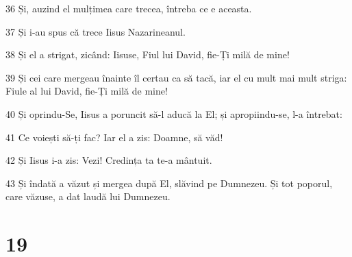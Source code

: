 \par 36 Și, auzind el mulțimea care trecea, întreba ce e aceasta.
\par 37 Și i-au spus că trece Iisus Nazarineanul.
\par 38 Și el a strigat, zicând: Iisuse, Fiul lui David, fie-Ți milă de mine!
\par 39 Și cei care mergeau înainte îl certau ca să tacă, iar el cu mult mai mult striga: Fiule al lui David, fie-Ți milă de mine!
\par 40 Și oprindu-Se, Iisus a poruncit să-l aducă la El; și apropiindu-se, l-a întrebat:
\par 41 Ce voiești să-ți fac? Iar el a zis: Doamne, să văd!
\par 42 Și Iisus i-a zis: Vezi! Credința ta te-a mântuit.
\par 43 Și îndată a văzut și mergea după El, slăvind pe Dumnezeu. Și tot poporul, care văzuse, a dat laudă lui Dumnezeu.

\chapter{19}

